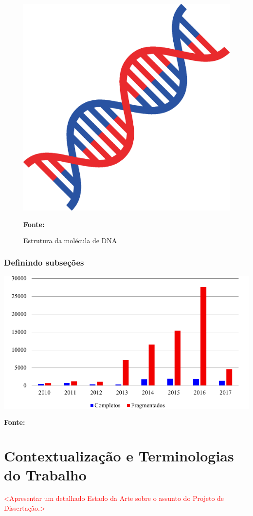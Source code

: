 \documentclass[
	12pt,				%
	openright,			%
	oneside,			%
	a4paper,			%
	chapter=TITLE,		%
	english,			%
	french,				%
	spanish,			%
	brazil				%
	]{abntex2}
\begin{document}
\begin{figure}[!htb]
	\caption{Estrutura da molécula de DNA}
	\label{fig:dna}
	\centering
	\includegraphics[width=.3\textwidth]{estrutura_dna.eps} \\
	\begin{small}\textbf{Fonte: }\end{small}
\end{figure}

\subsection{Definindo subseções}

\begin{grafico}[!htb]
	\caption{Projetos de sequenciamento de genomas cadastrados no banco de dados GOLD}
	\label{grafico:gold}
	\centering
	\includegraphics[width=.8\textwidth]{gold.pdf} \\
	\begin{small}\textbf{Fonte: }\end{small}
\end{grafico}

\chapter{Contextualização e Terminologias do Trabalho}
\label{cap:contextualizacao}

\textcolor{red}{<Apresentar um detalhado Estado da Arte sobre o assunto do Projeto de Dissertação.> }
\end{document}
